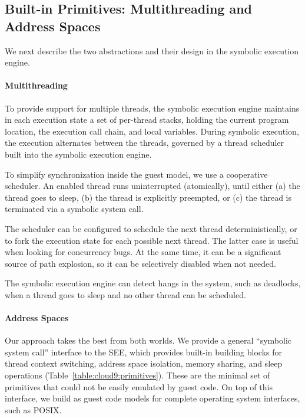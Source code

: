 \subsection{Built-in Primitives: Multithreading and Address Spaces}


We next describe the two abstractions and their design in the symbolic execution engine.

\paragraph{Multithreading}

To provide support for multiple threads, the symbolic execution engine maintains in each execution state a set of per-thread stacks, holding the current program location, the execution call chain, and local variables.
%
During symbolic execution, the execution alternates between the threads, governed by a thread scheduler built into the symbolic execution engine.

To simplify synchronization inside the guest model, we use a cooperative scheduler.  An enabled thread runs uninterrupted (atomically), until either (a) the thread goes to sleep, (b) the thread is explicitly preempted, or (c) the thread is terminated via a symbolic system call.

The scheduler can be configured to schedule the next thread deterministically, or to fork the execution state for each possible next thread.
%
The latter case is useful when looking for concurrency bugs.  At the same time, it can be a significant source of path explosion, so it can be selectively disabled when not needed.

The symbolic execution engine can detect hangs in the system, such as deadlocks, when a thread goes to sleep and no other thread can be scheduled.

\paragraph{Address Spaces}



Our approach takes the best from both worlds.
%
We provide a general ``symbolic system call'' interface to the SEE, which provides built-in building blocks for thread context switching, address space isolation, memory sharing, and sleep operations (Table~\ref{table:cloud9:primitives}).
%
These are the minimal set of primitives that could not be easily emulated by guest code.
%
On top of this interface, we build as guest code models for complete operating system interfaces, such as POSIX.

